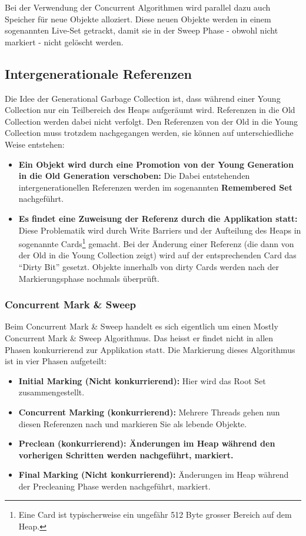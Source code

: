 Bei der Verwendung der Concurrent Algorithmen wird parallel dazu auch Speicher für neue Objekte alloziert. Diese neuen Objekte werden in einem sogenannten Live-Set getrackt, damit sie in der Sweep Phase - obwohl nicht markiert - nicht gelöscht werden.

\subsection{Intergenerationale Referenzen}
Die Idee der Generational Garbage Collection ist, dass während einer Young Collection nur ein Teilbereich des Heaps aufgeräumt wird. Referenzen in die Old Collection werden dabei nicht verfolgt. Den Referenzen von der Old in die Young Collection muss trotzdem nachgegangen werden, sie können auf unterschiedliche Weise entstehen:
\begin{itemize}
	\item \textbf{Ein Objekt wird durch eine Promotion von der Young Generation in die Old Generation verschoben:} Die Dabei entstehenden intergenerationellen Referenzen werden im sogenannten \textbf{Remembered Set} nachgeführt. 
	\item \textbf{Es findet eine Zuweisung der Referenz durch die Applikation statt:} Diese Problematik wird durch Write Barriers und der Aufteilung des Heaps in sogenannte Cards\footnote{Eine Card ist typischerweise ein ungefähr 512 Byte grosser Bereich auf dem Heap.} gemacht. Bei der Änderung einer Referenz (die dann von der Old in die Young Collection zeigt) wird auf der entsprechenden Card das ``Dirty Bit'' gesetzt. Objekte innerhalb von dirty Cards werden nach der Markierungsphase nochmals überprüft.
\end{itemize}

\subsubsection{Concurrent Mark \& Sweep}
Beim Concurrent Mark \& Sweep handelt es sich eigentlich um einen Mostly Concurrent Mark \& Sweep Algorithmus. Das heisst er findet nicht in allen Phasen konkurrierend zur Applikation statt. Die Markierung dieses Algorithmus ist in vier Phasen aufgeteilt:
\begin{itemize}
	\item \textbf{Initial Marking (Nicht konkurrierend):} Hier wird das Root Set zusammengestellt.
	\item \textbf{Concurrent Marking (konkurrierend):} Mehrere Threads gehen nun diesen Referenzen nach und markieren Sie als lebende Objekte.
	\item \textbf{Preclean (konkurrierend): Änderungen im Heap während den vorherigen Schritten werden nachgeführt, markiert.}
	\item \textbf{Final Marking (Nicht konkurrierend):} Änderungen im Heap während der Precleaning Phase werden nachgeführt, markiert.
\end{itemize}

